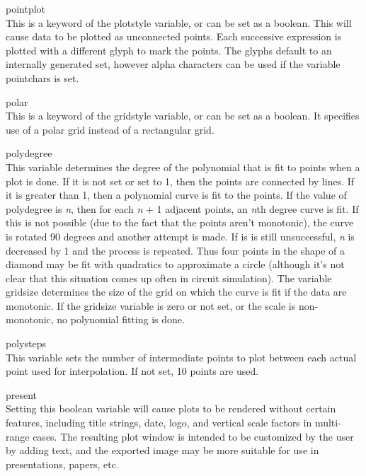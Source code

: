 \begin{description}
\item{\et pointplot}\\
This is a keyword of the {\et plotstyle} variable, or can be set as a
boolean.  This will cause data to be plotted as unconnected points. 
Each successive expression is plotted with a different glyph to mark
the points.  The glyphs default to an internally generated set,
however alpha characters can be used if the variable {\et pointchars}
is set.

\item{\et polar}\\
This is a keyword of the {\et gridstyle} variable, or can be set as a
boolean.  It specifies use of a polar grid instead of a rectangular
grid.

\item{\et polydegree}\\
This variable determines the degree of the polynomial that is fit to
points when a plot is done.  If it is not set or set to 1, then the
points are connected by lines.  If it is greater than 1, then a
polynomial curve is fit to the points.  If the value of {\et
polydegree} is {\it n\/}, then for each {\it n} + 1 adjacent points,
an {\it n\/}th degree curve is fit.  If this is not possible (due to
the fact that the points aren't monotonic), the curve is rotated 90
degrees and another attempt is made.  If is is still unsuccessful,
{\it n} is decreased by 1 and the process is repeated.  Thus four
points in the shape of a diamond may be fit with quadratics to
approximate a circle (although it's not clear that this situation
comes up often in circuit simulation).  The variable {\et gridsize}
determines the size of the grid on which the curve is fit if the data
are monotonic.  If the {\et gridsize} variable is zero or not set, or
the scale is non-monotonic, no polynomial fitting is done.

\item{\et polysteps}\\
This variable sets the number of intermediate points to plot between
each actual point used for interpolation.  If not set, 10 points are
used. 

\item{\et present}\\
Setting this boolean variable will cause plots to be rendered without
certain features, including title strings, date, logo, and vertical
scale factors in multi-range cases.  The resulting plot window is
intended to be customized by the user by adding text, and the exported
image may be more suitable for use in presentations, papers, etc.


\end{description}
